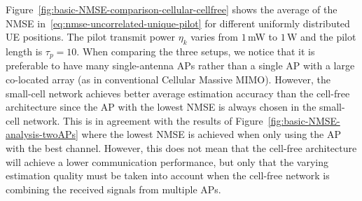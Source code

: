 Figure~\ref{fig:basic-NMSE-comparison-cellular-cellfree} shows the average of the NMSE in~\eqref{eq:nmse-uncorrelated-unique-pilot} for different uniformly distributed UE positions. The pilot transmit power $\eta_k$ varies from $1$\,mW to $1$\,W and the pilot length is $\tau_p = 10$. When comparing the three setups, we notice that it is preferable to have many single-antenna APs rather than a single AP with a large co-located array (as in conventional Cellular Massive MIMO). However, the small-cell network achieves better average estimation accuracy than the cell-free architecture since the AP with the lowest NMSE is always chosen in the small-cell network. This is in agreement with the results of Figure~\ref{fig:basic-NMSE-analysis-twoAPs} where the lowest NMSE is achieved when only using the AP with the best channel. However, this does not mean that the cell-free architecture will achieve a lower communication performance, but only that the varying estimation quality must be taken into account when the cell-free network is combining the received signals from multiple APs.

\enlargethispage{\baselineskip}

